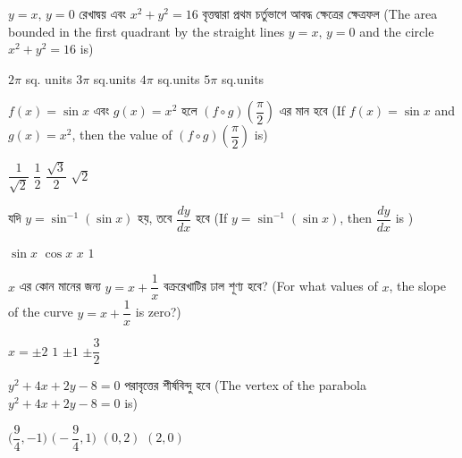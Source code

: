 \documentclass[addpoints]{exam}
\begin{document}
\begin{questions}
\begin{oneparchoices}
\end{oneparchoices}

\question   $ y=x,\, y=0 $ রেখাদ্বয় এবং $ x^2 + y^2 =16 $ বৃত্তদ্বারা প্রথম চর্তুভাগে আবদ্ধ ক্ষেত্রের ক্ষেত্রফল (The area bounded in the first quadrant by the straight lines $ y=x,\, y=0 $ and the circle $ x^2 + y^2 =16 $ is)

\begin{oneparchoices}
\choice $ 2\pi$ sq. units
\choice $ 3\pi $ sq.units
\choice $ 4\pi $ sq.units
\choice $ 5\pi $ sq.units

\end{oneparchoices}

\question  $ f(x) = \sin x $ এবং $ g(x) = x^2 $ হলে $ (f\circ g)(\dfrac{\pi}{2}) $ এর মান হবে (If $ f(x) = \sin x $ and $ g(x) = x^2 $, then the value of $ (f\circ g)(\dfrac{\pi}{2}) $ is)

\begin{oneparchoices}
\choice $ \dfrac{1}{\sqrt{2}}$ 
\choice $ \dfrac{1}{2} $ 
\choice $ \dfrac{\sqrt{3}}{2} $ 
\choice $ \sqrt{2} $ 

\end{oneparchoices}

\question    যদি $ y=\sin^{-1}(\sin x) $ হয়,  তবে $ \dfrac{dy}{dx} $ হবে (If $ y=\sin^{-1}(\sin x) $, then $ \dfrac{dy}{dx} $ is )

\begin{oneparchoices}
\choice $ \sin x$ 
\choice $ \cos x $ 
\choice $ x $ 
\choice $ 1 $ 

\end{oneparchoices}

\question    $ x $ এর কোন মানের জন্য $ y= x+ \dfrac{1}{x} $ বক্ররেখাটির ঢাল শূণ্য হবে? (For what values of $ x $, the slope of the curve $ y= x+ \dfrac{1}{x} $ is zero?)

\begin{oneparchoices}
\choice $ x=\pm 2 $
\choice $ 1 $
\choice $ \pm 1 $
\choice  $ \pm \dfrac{3}{2} $

\end{oneparchoices}

\question $ y^2 +4x+2y-8=0 $  পরাবৃত্তের শীর্ষবিন্দু হবে (The vertex of the parabola $ y^2 +4x+2y-8=0 $ is)

\begin{oneparchoices}
\choice $ \Big( \dfrac{9}{4}, -1\Big) $
\choice $ \Big(- \dfrac{9}{4}, 1\Big) $
\choice $ (0,2) $
\choice  $ (2,0) $

\end{oneparchoices}



\end{questions}
\end{document}
